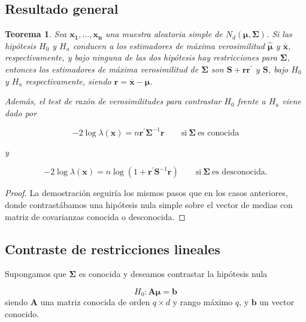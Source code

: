 \documentclass[
  a4paper,
  oneside]{scrbook}
\newtheorem{theorem}{Teorema}[chapter]
\theoremstyle{definition}
\theoremstyle{definition}
\theoremstyle{definition}
\theoremstyle{definition}
\theoremstyle{remark}
\begin{document}
\subsection{Resultado general}\label{resultado-general}

\begin{theorem}
\protect\hypertarget{thm:unnamed-chunk-21}{}\label{thm:unnamed-chunk-21}Sea \(\bm{x_1},\ldots,\bm{x_n}\) una muestra aleatoria simple de
\(N_d(\bm{\mu},\bm\Sigma)\). Si las hipótesis \(H_0\) y \(H_a\) conducen a los
estimadores de máxima verosimilitud \(\hat{\bm{\mu}}\) y
\(\overline{\bm{x}}\), respectivamente, y bajo ninguna de las dos
hipótesis hay restricciones para \(\bm\Sigma\), entonces los estimadores
de máxima verosimilitud de \(\bm\Sigma\) son
\(\bm{S}+\bm{r}\bm{r}^\prime{}\) y \(\bm{S}\), bajo \(H_0\) y \(H_a\)
respectivamente, siendo \(\bm{r}=\overline{\bm{x}}-\hat{\bm{\mu}}\).

Además, el test de razón de verosimilitudes para contrastar \(H_0\) frente
a \(H_a\) viene dado por

\begin{equation}
-2\log\lambda(\bm{x})=n\bm{r}^\prime{}\bm\Sigma^{-1}\bm{r} \qquad \mbox{si}\ \bm\Sigma\ \mbox{es conocida}
  \label{eq:conocido}
\end{equation}

y

\begin{equation}
-2\log\lambda(\bm{x})=n\log\left(1+\bm{r}^\prime{}\bm{S}^{-1}\bm{r}\right)
 \qquad \mbox{si}\ \bm\Sigma\ \mbox{es desconocida.}
  \label{eq:desconocido}
\end{equation}
\end{theorem}

\begin{proof}
La demostración seguiría los mismos pasos que en los casos
anteriores, donde contrastábamos una hipótesis nula simple sobre el
vector de medias con matriz de covarianzas conocida o desconocida.
\end{proof}

\subsection{Contraste de restricciones lineales}\label{contraste-de-restricciones-lineales}

Supongamos que \(\bm\Sigma\) es conocida y deseamos contrastar la
hipótesis nula

\[H_0: \bm{A}\bm{\mu}=\bm{b}\] siendo \(\bm{A}\) una matriz
conocida de orden \(q\times d\) y rango máximo \(q\), y \(\bm{b}\) un vector
conocido.
\end{document}
